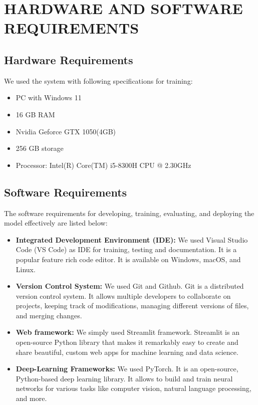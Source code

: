 \newpage
\section{HARDWARE AND SOFTWARE REQUIREMENTS}
\subsection{Hardware Requirements}
We used the system with following specifications for training:
\begin{itemize}
    \item PC with Windows 11
    \item 16 GB RAM 
    \item Nvidia Geforce GTX 1050(4GB)
    \item 256 GB storage
    \item Processor: Intel(R) Core(TM) i5-8300H CPU @ 2.30GHz
\end{itemize}
\subsection{Software Requirements}
The software requirements for developing, training, evaluating, and deploying the
model effectively are listed below: 
\begin{itemize}
    \item {\bf Integrated Development Environment (IDE):} We used Visual Studio Code (VS Code) as IDE for training, testing and documentation. 
    It  is a popular feature rich code editor. It is available on Windows, macOS, and Linux.
    \item {\bf Version Control System:} We used Git and Github. Git is a distributed version control system. It allows multiple developers to collaborate on projects, keeping track of modifications, managing different versions of files, and merging changes.
    \item {\bf Web framework:} We simply used Streamlit framework. Streamlit is an open-source Python library that makes it remarkably easy to create and share beautiful, custom web apps for machine learning and data science.
    \item {\bf Deep-Learning Frameworks:} We used PyTorch. It is an open-source, Python-based deep learning library. It allows to build and train neural networks for various tasks like computer vision, natural language processing, and more.
\end{itemize}